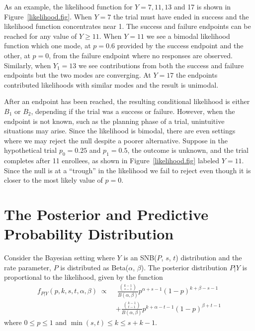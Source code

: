 \documentclass[sii]{ipart}
\begin{document}
As an example, the likelihood function for $Y = 7, 11, 13$ and 17 is shown in
Figure~\ref{likelihood.fig}. When $Y = 7$ the trial must have ended in success and the likelihood function concentrates near 1. The success and
failure endpoints can be reached for any value of $Y \geq 11$. When 
$Y = 11$ we see a bimodal likelihood function which one mode, at $p=0.6$
provided by the success endpoint and the other, at $p=0$, from the
failure endpoint where no responses are observed. Similarly, when $Y_1=13$
we see contributions from both the success and failure endpoints but
the two modes are converging. At $Y=17$ the endpoints contributed likelihoods with similar modes and the result is unimodal.

After an endpoint has been reached, the resulting conditional likelihood is either $B_1$ or $B_2$, depending if the trial was a success or failure. However, when the endpoint is not known, such as the planning phase of a trial, unintuitive situations may arise. Since the likelihood is bimodal, there are even settings where we may reject the null despite a poorer alternative. Suppose in the hypothetical trial $p_0=0.25$ and $p_1=0.5$, the outcome is unknown, and the trial completes after 11 enrollees, as shown in Figure~\ref{likelihood.fig} labeled $Y=11$. Since the null is at a ``trough'' in the likelihood we fail to reject even though it is closer to the most likely value of $p=0$. 

\section{The Posterior and Predictive Probability Distribution} \label{bayesian_extension}

Consider the Bayesian setting where $Y$ is an SNB($P$, $s$, $t$) distribution and the rate parameter, $P$ 
is distributed as Beta($\alpha$, $\beta$). The posterior distribution $P|Y$ is proportional to the 
likelihood, given by the function
\begin{align} \label{eqn:ptl}
f_{P|Y}(p, k, s, t, \alpha, \beta) \; \propto \ &
  \ \frac{ {k-1 \choose s-1} }{B(\alpha, \beta)} p^{\alpha +s -1} 
    (1-p)^{k+\beta-s-1} \\
  & + \frac{ {k-1 \choose t-1} }{B(\alpha, \beta)} p^{k+\alpha -t -1} 
    (1-p)^{\beta+t-1} \nonumber
\end{align}
where $0 \leq p \leq 1$ and $\min(s, t) \leq k \leq s+k-1$.
\end{document}
